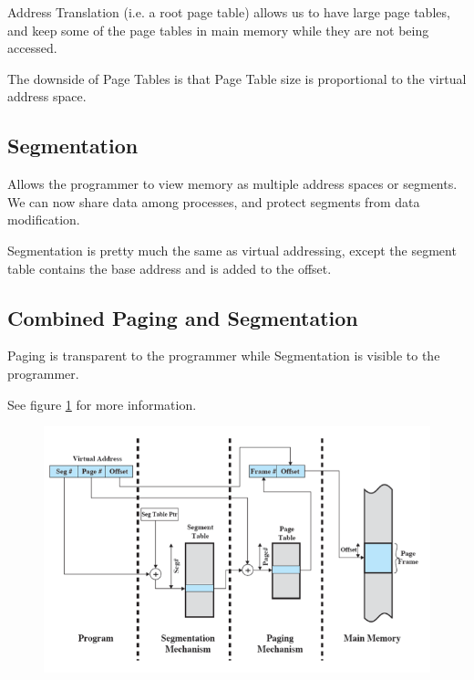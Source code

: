             Address Translation (i.e. a root page table) allows us to have large
            page tables, and keep some of the page tables in main memory while they
            are not being accessed.

            The downside of Page Tables is that Page Table size is proportional to
            the virtual address space.

            \subsection{Segmentation} %
            \label{subsec:segmentation}
            Allows the programmer to view memory as multiple address spaces or
            segments. We can now share data among processes, and protect segments
            from data modification.

            Segmentation is pretty much the same as virtual addressing, except the
            segment table contains the base address and is added to the offset.

            \subsection{Combined Paging and Segmentation} %
            \label{subsec:combined_paging_and_segmentation}
            Paging is transparent to the programmer while Segmentation is
            visible to the programmer.

            See figure \ref{fig:address_translation_and_segmentation} for more
            information.
            \begin{figure}[h]
                \label{fig:address_translation_and_segmentation}
                \centering
                \includegraphics[scale=0.5,keepaspectratio]{images/address-translation-and-segmentation.png}
            \end{figure}

